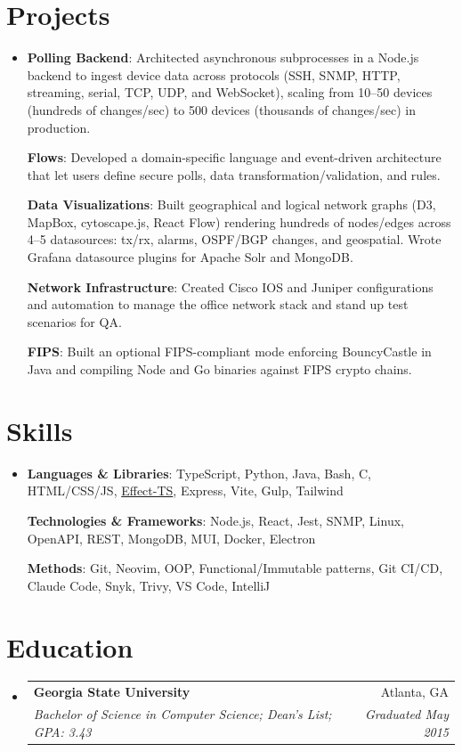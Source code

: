 \documentclass[letterpaper,11pt]{article}
\makeatletter
\newcommand{\mytexttilde}{\raisebox{0.5ex}{\texttildelow}}
\newcommand{\resumeSubHeadingListStart}{\begin{itemize}[leftmargin=0.08in, label={}]}
\newcommand{\resumeSubHeadingListEnd}{\end{itemize}}
\newcommand{\resumeSubheadingWithFootnote}[4]{
  \vspace{-5pt}\item
    \begin{tabular*}{0.97\textwidth}[t]{l@{\extracolsep{\fill}}r}
      \textbf{#1} & #2 \vspace{0pt} \\
      \textit{\small#3} & \textit{\small#4} \\
    \end{tabular*}\vspace{-7pt}
}
\newcommand{\boldSubjectWithDesc}[2]{
  \normalsize{\textbf{#1}{: #2 \vspace{-2pt}}}
}
\makeatother
\begin{document}
\section{Projects}
\resumeSubHeadingListStart
\item{
            \boldSubjectWithDesc{Polling Backend}{
              Architected asynchronous subprocesses in a Node.js backend to ingest device data across protocols (SSH, SNMP, HTTP, streaming, serial, TCP, UDP, and WebSocket), scaling from 10--50 devices (hundreds of changes/sec) to \mytexttilde500 devices (thousands of changes/sec) in production.
            }

            \boldSubjectWithDesc{Flows}{Developed a domain-specific language and event-driven architecture that let users define secure polls, data transformation/validation, and rules.}

            \boldSubjectWithDesc{Data Visualizations}{
              Built geographical and logical network graphs (D3, MapBox, cytoscape.js, React Flow) rendering hundreds of nodes/edges across 4--5 datasources: tx/rx, alarms, OSPF/BGP changes, and geospatial. Wrote Grafana datasource plugins for Apache Solr and MongoDB.
            }

            \boldSubjectWithDesc{Network Infrastructure}{Created Cisco IOS and Juniper configurations and automation to manage the office network stack and stand up test scenarios for QA.}

            \boldSubjectWithDesc{FIPS}{Built an optional FIPS-compliant mode enforcing BouncyCastle in Java and compiling Node and Go binaries against FIPS crypto chains.}
      }
\resumeSubHeadingListEnd

\section{Skills}
\resumeSubHeadingListStart
\item{
            \boldSubjectWithDesc{Languages \& Libraries}{TypeScript, Python, Java, Bash, C, HTML/CSS/JS, \href{https://github.com/Effect-TS/effect}{Effect-TS}, Express, Vite, Gulp, Tailwind}

            \boldSubjectWithDesc{Technologies \& Frameworks}{Node.js, React, Jest, SNMP, Linux, OpenAPI, REST, MongoDB, MUI, Docker, Electron}

            \boldSubjectWithDesc{Methods}{Git, Neovim, OOP, Functional/Immutable patterns, Git CI/CD, Claude Code, Snyk, Trivy, VS Code, IntelliJ}
      }
\resumeSubHeadingListEnd

\section{Education}
\vspace{2pt}
\resumeSubHeadingListStart
\resumeSubheadingWithFootnote
{Georgia State University}{Atlanta, GA}
{Bachelor of Science in Computer Science; Dean's List; GPA: 3.43}{Graduated May 2015}
\resumeSubHeadingListEnd
\end{document}
